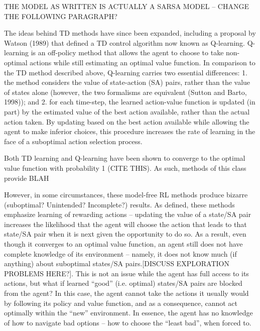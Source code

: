 \documentclass[10pt,letterpaper]{article}
\begin{document}
THE MODEL AS WRITTEN IS ACTUALLY A SARSA MODEL – CHANGE THE FOLLOWING PARAGRAPH?

The ideas behind TD methods have since been expanded, including a proposal by Watson (1989) that defined a TD control algorithm now known as Q-learning. Q-learning is an off-policy method that allows the agent to choose to take non-optimal actions while still estimating an optimal value function. In comparison to the TD method described above, Q-learning carries two essential differences: 1. the method considers the value of state-action (SA) pairs, rather than the value of states alone (however, the two formalisms are equivalent (Sutton and Barto, 1998)); and 2. for each time-step, the learned action-value function is updated (in part) by the estimated value of the best action available, rather than the actual action taken. By updating based on the best action available while allowing the agent to make inferior choices, this procedure increases the rate of learning in the face of a suboptimal action selection process.

Both TD learning and Q-learning have been shown to converge to the optimal value function with probability 1 (CITE THIS). As such, methods of this class provide BLAH

However, in some circumstances, these model-free RL methods produce bizarre (suboptimal? Unintended? Incomplete?) results. As defined, these methods emphasize learning of rewarding actions – updating the value of a state/SA pair increases the likelihood that the agent will choose the action that leads to that state/SA pair when it is next given the opportunity to do so. As a result, even though it converges to an optimal value function, an agent still does not have complete knowledge of its environment – namely, it does not know much (if anything) about suboptimal states/SA pairs.[DISCUSS EXPLORATION PROBLEMS HERE?]. This is not an issue while the agent has full access to its actions, but what if learned “good” (i.e. optimal) states/SA pairs are blocked from the agent? In this case, the agent cannot take the actions it usually would by following its policy and value function, and as a consequence, cannot act optimally within the “new” environment. In essence, the agent has no knowledge of how to navigate bad options – how to choose the “least bad”, when forced to.
\end{document}
